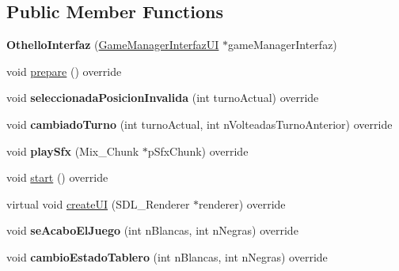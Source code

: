 \subsection*{Public Member Functions}
\begin{DoxyCompactItemize}
\item 
{\bfseries Othello\+Interfaz} (\hyperlink{class_game_manager_interfaz_u_i}{Game\+Manager\+Interfaz\+UI} $\ast$game\+Manager\+Interfaz)\hypertarget{class_othello_interfaz_a81e5e11395ea8385965e37d6ac5f8ed2}{}\label{class_othello_interfaz_a81e5e11395ea8385965e37d6ac5f8ed2}

\item 
void \hyperlink{class_othello_interfaz_ab090b9f23617c40327b0ea0f0bd7cd6e}{prepare} () override
\item 
void {\bfseries seleccionada\+Posicion\+Invalida} (int turno\+Actual) override\hypertarget{class_othello_interfaz_ac15fd77d3667c95c2347ceee05554a4c}{}\label{class_othello_interfaz_ac15fd77d3667c95c2347ceee05554a4c}

\item 
void {\bfseries cambiado\+Turno} (int turno\+Actual, int n\+Volteadas\+Turno\+Anterior) override\hypertarget{class_othello_interfaz_a458dda2df5d645e7eda3b24dcad808cd}{}\label{class_othello_interfaz_a458dda2df5d645e7eda3b24dcad808cd}

\item 
void {\bfseries play\+Sfx} (Mix\+\_\+\+Chunk $\ast$p\+Sfx\+Chunk) override\hypertarget{class_othello_interfaz_a7980ab03fac76869d163e370f36ae680}{}\label{class_othello_interfaz_a7980ab03fac76869d163e370f36ae680}

\item 
void \hyperlink{class_othello_interfaz_aea74ce8b825eda869992d18268cdddb2}{start} () override
\item 
virtual void \hyperlink{class_othello_interfaz_af54c0303476eca871b509d6b77151abe}{create\+UI} (S\+D\+L\+\_\+\+Renderer $\ast$renderer) override
\item 
void {\bfseries se\+Acabo\+El\+Juego} (int n\+Blancas, int n\+Negras) override\hypertarget{class_othello_interfaz_a39751c6955dc345b76cef69d6e2ba4f0}{}\label{class_othello_interfaz_a39751c6955dc345b76cef69d6e2ba4f0}

\item 
void {\bfseries cambio\+Estado\+Tablero} (int n\+Blancas, int n\+Negras) override\hypertarget{class_othello_interfaz_a44283dd469110e8ab51f2dae4447a1e2}{}\label{class_othello_interfaz_a44283dd469110e8ab51f2dae4447a1e2}


\end{DoxyCompactItemize}
